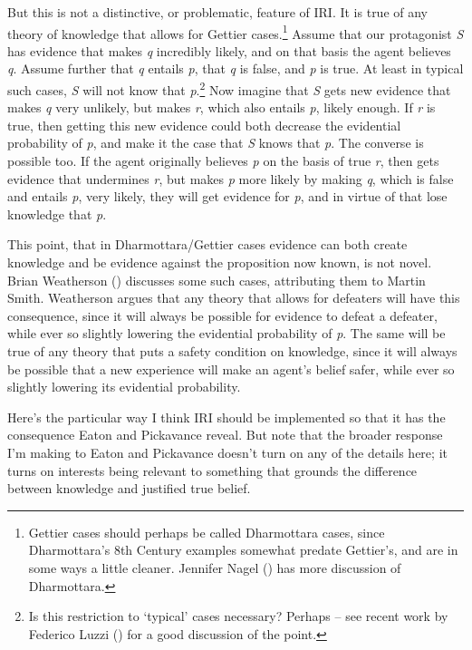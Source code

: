\documentclass[
  10pt,
  letterpaper,
  DIV=11,
  numbers=noendperiod,
  twoside]{scrartcl}
\begin{document}
But this is not a distinctive, or problematic, feature of IRI. It is
true of any theory of knowledge that allows for Gettier
cases.\footnote{Gettier cases should perhaps be called Dharmottara
  cases, since Dharmottara's 8th Century examples somewhat predate
  Gettier's, and are in some ways a little cleaner. Jennifer Nagel
  () has more discussion of
  Dharmottara.} Assume that our protagonist \emph{S} has evidence that
makes \emph{q} incredibly likely, and on that basis the agent believes
\emph{q}. Assume further that \emph{q} entails \emph{p}, that \emph{q}
is false, and \emph{p} is true. At least in typical such cases, \emph{S}
will not know that \emph{p}.\footnote{Is this restriction to `typical'
  cases necessary? Perhaps -- see recent work by Federico Luzzi
  () for a good discussion of the point.}
Now imagine that \emph{S} gets new evidence that makes \emph{q} very
unlikely, but makes \emph{r}, which also entails \emph{p}, likely
enough. If \emph{r} is true, then getting this new evidence could both
decrease the evidential probability of \emph{p}, and make it the case
that \emph{S} knows that \emph{p}. The converse is possible too. If the
agent originally believes \emph{p} on the basis of true \emph{r}, then
gets evidence that undermines \emph{r}, but makes \emph{p} more likely
by making \emph{q}, which is false and entails \emph{p}, very likely,
they will get evidence for \emph{p}, and in virtue of that lose
knowledge that \emph{p}.

This point, that in Dharmottara/Gettier cases evidence can both create
knowledge and be evidence against the proposition now known, is not
novel. Brian Weatherson ()
discusses some such cases, attributing them to Martin Smith. Weatherson
argues that any theory that allows for defeaters will have this
consequence, since it will always be possible for evidence to defeat a
defeater, while ever so slightly lowering the evidential probability of
\emph{p}. The same will be true of any theory that puts a safety
condition on knowledge, since it will always be possible that a new
experience will make an agent's belief safer, while ever so slightly
lowering its evidential probability.

Here's the particular way I think IRI should be implemented so that it
has the consequence Eaton and Pickavance reveal. But note that the
broader response I'm making to Eaton and Pickavance doesn't turn on any
of the details here; it turns on interests being relevant to something
that grounds the difference between knowledge and justified true belief.
\end{document}
